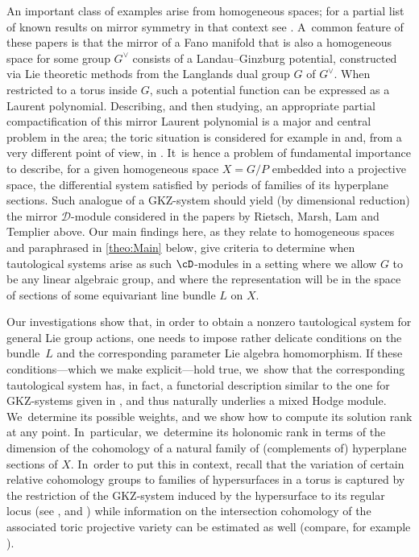 An important class of examples arise from homogeneous spaces; for a
partial list of known results on mirror symmetry in that context see
\cite{Rietsch, Marsh-Rietsch, Lam-Templier}. A~common feature of these
papers is that the mirror of a Fano manifold that is
also a homogeneous space for some group $G^\vee$ consists of a
Landau--Ginzburg potential, constructed via Lie theoretic methods from
the Langlands dual group $G$ of $G^\vee$. When restricted to a torus
inside $G$, such a potential function can be expressed as a Laurent
polynomial. Describing, and then studying, an appropriate partial
compactification of this mirror Laurent polynomial is a major and
central problem in the area; the toric situation is considered for
example in \cite{RS12} and, from a very different point of view, in
\cite{Siebert-TropLG}. It~is hence a problem of fundamental importance to
describe, for a given homogeneous space $X=G/P$ embedded into a
projective space, the differential system satisfied by periods of
families of its hyperplane sections. Such analogue
of a GKZ-system should yield (by dimensional reduction) the
mirror $\mathscr{D}$\nobreakdash-mod\-ule considered in the papers by Rietsch,
Marsh, Lam and Templier above.
Our main findings here, as they relate to homogeneous
spaces and
paraphrased in \cref{theo:Main} below, give criteria to determine when
tautological systems arise as such $\cD$\nobreakdash-mod\-ules in a setting where we
allow $G$ to be any linear algebraic group, and where the
representation will be in the space of sections of some equivariant
line bundle $L$ on $X$.

Our investigations show that, in order to obtain a
nonzero tautological system for general Lie group actions, one
needs to impose rather delicate conditions on the bundle~$L$ and the
corresponding parameter Lie algebra homomorphism. If
these conditions---which we make explicit---hold true, we~show that
the corresponding tautological system has, in fact, a
functorial description similar to the one for
GKZ-systems given in \cite{GKZ90,SW09}, and thus naturally
underlies a mixed Hodge module. We~determine its possible weights, and
we show how to compute its solution rank at any point. In~particular, we~determine its holonomic rank in terms of the dimension of the
cohomology of a natural family of (complements of) hyperplane sections
of $X$. In~order to put this in context, recall that
the variation of certain relative cohomology
groups to families of hypersurfaces in a torus is captured
by the restriction of the GKZ-system induced by the hypersurface to
its regular locus (see \cite[Th.\,2.13]{Reich2},
\cite{Stienstra} and \cite{ReichWalth-Duco}) while information on the
intersection cohomology of the associated toric projective variety
can be estimated as well (compare, for example
\cite[Prop.\,2.14]{RS12}).

